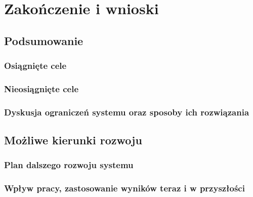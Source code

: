 \chapter{Zakończenie i wnioski}
\section{Podsumowanie}
\subsection{Osiągnięte cele}
\subsection{Nieosiągnięte cele}
\subsection{Dyskusja ograniczeń systemu oraz sposoby ich rozwiązania}
\section{Możliwe kierunki rozwoju}
\subsection{Plan dalszego rozwoju systemu}
\subsection{Wpływ pracy, zastosowanie wyników teraz i w przyszłości}

